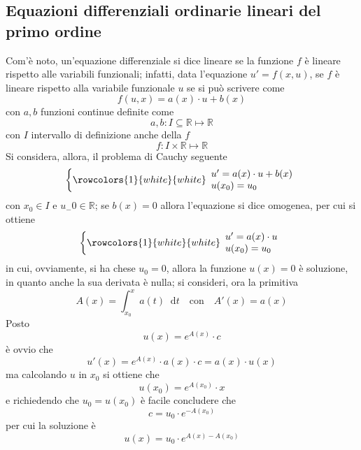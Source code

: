 \documentclass[a4paper]{extarticle}
\newcommand*\dif{\mathop{}\!\mathrm{d}}
\begin{document}
\subsection{Equazioni differenziali ordinarie lineari del primo ordine}
Com'è noto, un'equazione differenziale si dice lineare se la funzione $f$ è lineare rispetto alle variabili funzionali; infatti, data l'equazione $u'=f(x,u)$, se $f$ è lineare rispetto alla variabile funzionale $u$ se si può scrivere come
\[f(u,x)=a(x) \cdot u + b(x)\]
con $a,b$ funzioni continue definite come
\[a,b : I \subseteq \mathbb{R} \longmapsto \mathbb{R}\]
con $I$ intervallo di definizione anche della $f$
\[f : I \times \mathbb{R} \longmapsto \mathbb{R}\]
Si considera, allora, il problema di Cauchy seguente
\[\left\{
    \rowcolors{1}{white}{white}
    \begin{array}{lll}
        u'=a(x) \cdot u + b(x)\\
        u(x_0)=u_0\\
    \end{array}
\right.\]
con $x_0 \in I$ e $u_-0 \in \mathbb{R}$; se $b(x)=0$ allora l'equazione si dice omogenea, per cui si ottiene
\[\left\{
    \rowcolors{1}{white}{white}
    \begin{array}{lll}
        u'=a(x) \cdot u\\
        u(x_0)=u_0\\
    \end{array}
\right.\]
in cui, ovviamente, si ha chese $u_0=0$, allora la funzione $u(x)=0$ è soluzione, in quanto anche la sua derivata è nulla; si consideri, ora la primitiva
\[A(x) = \int_{x_0}^x a(t) \dif t \hspace{1em} \text{con} \hspace{1em} A'(x)=a(x)\]
Posto
\[u(x)=e^{A(x)} \cdot c\]
è ovvio che
\[u'(x) = e^{A(x)} \cdot a(x) \cdot c = a(x) \cdot u(x)\]
ma calcolando $u$ in $x_0$ si ottiene che
\[u(x_0) = e^{A(x_0)} \cdot x\]
e richiedendo che $u_0=u(x_0)$ è facile concludere che
\[c = u_0 \cdot e^{-A(x_0)}\]
per cui la soluzione è
\[\boxed{u(x)=u_0 \cdot e^{A(x)-A(x_0)}}\]
\end{document}

